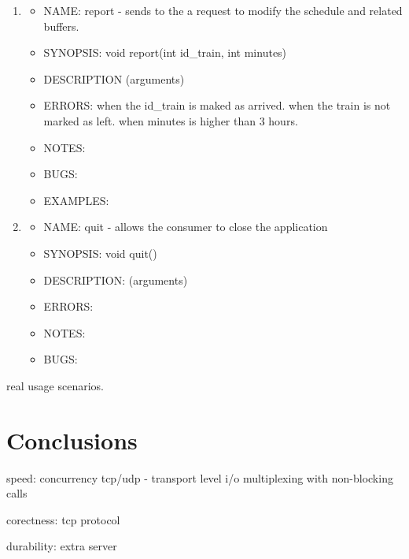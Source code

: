 \documentclass[runningheads]{llncs}
\begin{document}
\begin{enumerate}
   \item \begin{itemize} \item NAME: report - sends to the a request to modify the schedule and related buffers.
            \item SYNOPSIS: void report(int id\_train, int minutes)  
            \item DESCRIPTION (arguments)
            \item ERRORS: when the id\_train is maked as arrived. when the train is not marked as left. when minutes is higher than 3 hours.
            \item NOTES:
            \item BUGS:
            \item EXAMPLES:
            \vspace{0.3cm}
   \end{itemize}
   
   \item \begin{itemize} \item NAME: quit - allows the consumer to close the application
            \item SYNOPSIS: void quit()  
            \item DESCRIPTION: (arguments)
            \item ERRORS:
            \item NOTES:
            \item BUGS:
   \end{itemize}
\end{enumerate}

real usage scenarios.


\section{Conclusions}

speed:
concurrency
tcp/udp - transport level
i/o multiplexing with non-blocking calls

corectness:
tcp protocol

durability:
extra server
\end{document}
